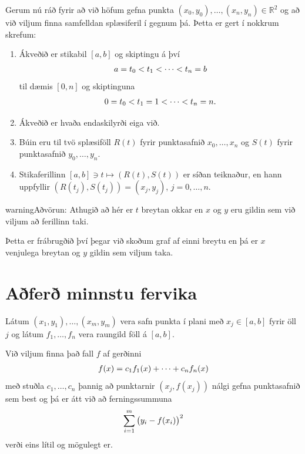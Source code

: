 \documentclass[letterpaper,10pt,icelandic]{sphinxmanual}
\begin{document}
Gerum nú ráð fyrir að við höfum gefna punkta \((x_0,y_0),\dots,(x_n,y_n) \in \mathbb R^2\)
og að við viljum finna samfelldan splæsiferil í gegnum þá. Þetta er gert
í nokkrum skrefum:
\begin{enumerate}
\item {} 
Ákveðið er stikabil \([a,b]\) og skiptingu á því
\begin{gather}
\begin{split}a=t_0<t_1<\cdots<t_n=b\end{split}\notag
\end{gather}
til dæmis \([0,n]\) og skiptinguna
\begin{gather}
\begin{split}0=t_0<t_1=1<\cdots<t_n=n.\end{split}\notag
\end{gather}
\item {} 
Ákveðið er hvaða endaskilyrði eiga við.

\item {} 
Búin eru til tvö splæsiföll \(R(t)\) fyrir punktasafnið
\(x_0,\dots,x_n\) og \(S(t)\) fyrir punktasafnið
\(y_0,\dots,y_n\).

\item {} 
Stikaferillinn \([a,b]\ni t\mapsto (R(t),S(t))\) er síðan teiknaður, en hann uppfyllir
\((R(t_j),S(t_j))=(x_j,y_j)\), \(j=0,\dots,n\).

\end{enumerate}

\begin{notice}{warning}{Aðvörun:}
Athugið að hér er \(t\) breytan okkar en \(x\) og \(y\) eru gildin sem við
viljum að ferillinn taki.

Þetta er frábrugðið því þegar við skoðum graf af einni breytu en þá er
\(x\) venjulega breytan og \(y\) gildin sem viljum taka.
\end{notice}


\section{Aðferð minnstu fervika}
\label{kafli03:index-23}\label{kafli03:afer-minnstu-fervika}
Látum \((x_1,y_1),\dots,(x_m,y_m)\) vera safn punkta í plani með
\(x_j\in
[a,b]\) fyrir öll \(j\) og látum \(f_1,\dots,f_n\) vera raungild
föll á \([a,b]\).

Við viljum finna það fall \(f\) af gerðinni
\begin{gather}
\begin{split}f(x)=c_1f_1(x) + \cdots + c_nf_n(x)\end{split}\notag
\end{gather}
með stuðla \(c_1, \ldots, c_n\) þannig að punktarnir
\((x_j,f(x_j))\) nálgi gefna punktasafnið sem best og þá er átt við
að ferningssummuna
\begin{gather}
\begin{split}\sum_{i=1}^m\big(y_i-f(x_i)\big)^2\end{split}\notag
\end{gather}
verði eins lítil og mögulegt er.
\end{document}
